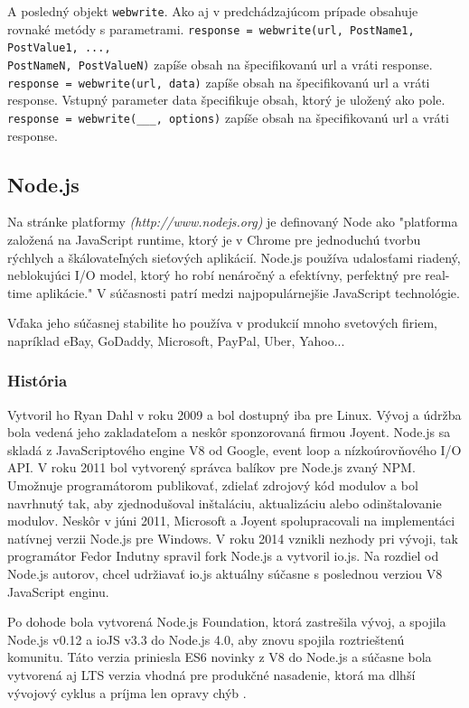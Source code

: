 A posledný objekt \verb|webwrite|. Ako aj v predchádzajúcom prípade obsahuje rovnaké metódy s parametrami. \verb|response = webwrite(url, PostName1, PostValue1, ...,| \\ \verb|PostNameN, PostValueN)| zapíše obsah na špecifikovanú url a vráti response.\\ \verb|response = webwrite(url, data)| zapíše obsah na špecifikovanú url a vráti response. Vstupný parameter data špecifikuje obsah, ktorý je uložený ako pole.\\
\verb|response = webwrite(___, options)| zapíše obsah na špecifikovanú url a vráti response.

\subsection{Node.js}
Na stránke platformy \textit{(http://www.nodejs.org)} je definovaný Node ako "platforma založená na JavaScript runtime, ktorý je v Chrome pre jednoduchú tvorbu rýchlych a škálovateľných sieťových aplikácií. Node.js používa udalosťami riadený, neblokujúci I/O model, ktorý ho robí nenáročný a efektívny, perfektný pre real-time aplikácie." V súčasnosti patrí medzi najpopulárnejšie JavaScript technológie.

Vďaka jeho súčasnej stabilite ho používa v produkcií mnoho svetových firiem, napríklad eBay, GoDaddy, Microsoft, PayPal, Uber, Yahoo...


\subsubsection{História}
Vytvoril ho Ryan Dahl v roku 2009 a bol dostupný iba pre Linux. Vývoj a údržba bola vedená jeho zakladateľom a neskôr sponzorovaná firmou Joyent. Node.js sa skladá z JavaScriptového engine V8 od Google, event loop a nízkoúrovňového I/O API. V roku 2011 bol vytvorený správca balíkov pre Node.js zvaný NPM. Umožnuje programátorom publikovať, zdielať zdrojový kód modulov a bol navrhnutý tak, aby zjednodušoval inštaláciu, aktualizáciu alebo odinštalovanie modulov. Neskôr v júni 2011, Microsoft a Joyent spolupracovali na implementáci natívnej verzii Node.js pre Windows. V roku 2014 vznikli nezhody pri vývoji, tak programátor Fedor Indutny spravil fork Node.js a vytvoril io.js. Na rozdiel od Node.js autorov, chcel udržiavať io.js aktuálny súčasne s poslednou verziou V8 JavaScript enginu.

Po dohode bola vytvorená Node.js Foundation, ktorá zastrešila vývoj, a spojila Node.js v0.12 a ioJS v3.3 do Node.js 4.0, aby znovu spojila roztrieštenú komunitu. Táto verzia priniesla ES6 novinky z V8 do Node.js a súčasne bola vytvorená aj LTS verzia vhodná pre produkčné nasadenie, ktorá ma dlhší vývojový cyklus a príjma len opravy chýb \cite{nodejs-wiki}.

